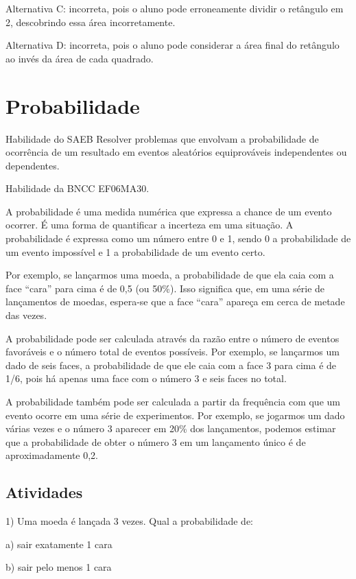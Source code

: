 Alternativa C: incorreta, pois o aluno pode erroneamente dividir o
retângulo em 2, descobrindo essa área incorretamente.

Alternativa D: incorreta, pois o aluno pode considerar a área final do
retângulo ao invés da área de cada quadrado.

\chapter{Probabilidade}

Habilidade do SAEB Resolver problemas que envolvam a probabilidade de
ocorrência de um resultado em eventos aleatórios equiprováveis
independentes ou dependentes.

Habilidade da BNCC EF06MA30.

A probabilidade é uma medida numérica que expressa a chance de um evento
ocorrer. É uma forma de quantificar a incerteza em uma situação. A
probabilidade é expressa como um número entre 0 e 1, sendo 0 a
probabilidade de um evento impossível e 1 a probabilidade de um evento
certo.

Por exemplo, se lançarmos uma moeda, a probabilidade de que ela caia com
a face ``cara'' para cima é de 0,5 (ou 50\%). Isso significa que, em uma
série de lançamentos de moedas, espera-se que a face ``cara'' apareça em
cerca de metade das vezes.

A probabilidade pode ser calculada através da razão entre o número de
eventos favoráveis e o número total de eventos possíveis. Por exemplo,
se lançarmos um dado de seis faces, a probabilidade de que ele caia com
a face 3 para cima é de 1/6, pois há apenas uma face com o número 3 e
seis faces no total.

A probabilidade também pode ser calculada a partir da frequência com que
um evento ocorre em uma série de experimentos. Por exemplo, se jogarmos
um dado várias vezes e o número 3 aparecer em 20\% dos lançamentos,
podemos estimar que a probabilidade de obter o número 3 em um lançamento
único é de aproximadamente 0,2.

\section{Atividades}

1) Uma moeda é lançada 3 vezes. Qual a probabilidade de:

a) sair exatamente 1 cara

b) sair pelo menos 1 cara

